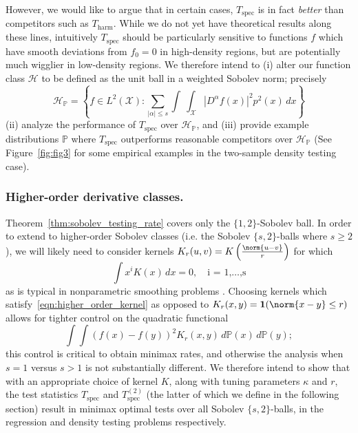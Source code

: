 \documentclass{article}
\newcommand{\abs}[1]{\left \lvert #1 \right \rvert}
\newcommand{\set}[1]{\left\{#1\right\}}
\newcommand{\1}{\mathbf{1}}
\newcommand{\Pbb}{\mathbb{P}}
\theoremstyle{alden}
\theoremstyle{aldenthm}
\theoremstyle{definition}
\theoremstyle{remark}
\begin{document}
However, we would like to argue that in certain cases, $T_{\textrm{spec}}$ is in fact \textit{better} than competitors such as $T_{\textrm{harm}}$. While we do not yet have theoretical results along these lines, intuitively $T_{\textrm{spec}}$ should be particularly sensitive to functions $f$ which have smooth deviations from $f_0 = 0$ in high-density regions, but are potentially much wigglier in low-density regions. We therefore intend to (i) alter our function class $\mathcal{H}$ to be defined as the unit ball in a weighted Sobolev norm; precisely
\begin{equation*}
\mathcal{H}_{\Pbb} = \set{f \in L^2(\mathcal{X}): \sum_{\abs{\alpha} \leq s}\int\ \int_{\mathcal{X}} \abs{D^{\alpha}f(x)}^2 p^2(x)\,dx}
\end{equation*}
(ii) analyze the performance of $T_{\mathrm{spec}}$ over $\mathcal{H}_{\Pbb}$, and (iii) provide example distributions $\Pbb$ where $T_{\mathrm{spec}}$ outperforms reasonable competitors over $\mathcal{H}_{\Pbb}$ (See Figure~\ref{fig:fig3} for some empirical examples in the two-sample density testing case).

\subsubsection{Higher-order derivative classes.}
Theorem~\ref{thm:sobolev_testing_rate} covers only the $\{1,2\}$-Sobolev ball. In order to extend to higher-order Sobolev classes (i.e. the Sobolev $\{s,2\}$-balls where $s \geq 2$), we will likely need to consider kernels $K_r(u,v) = K\left(\frac{\norm{u - v}}{r}\right)$ for which
\begin{equation}
\label{eqn:higher_order_kernel}
\int x^i K(x) \,dx = 0, \quad \textrm{i = 1,\ldots,s}
\end{equation}
as is typical in nonparametric smoothing problems \cite{tsybakov08}. Choosing kernels which satisfy~\eqref{eqn:higher_order_kernel} as opposed to $K_r(x,y) = \1(\norm{x - y} \leq r)$ allows for tighter control on the quadratic functional
\begin{equation*}
\int \int (f(x) - f(y))^2 K_r(x,y) \,d\Pbb(x) \,d\Pbb(y);
\end{equation*}
this control is critical to obtain minimax rates, and otherwise the analysis when $s = 1$ versus $s > 1$ is not substantially different. We therefore intend to show that with an appropriate choice of kernel $K$, along with tuning parameters $\kappa$ and $r$, the test statistics $T_{\mathrm{spec}}$ and $T_{\mathrm{spec}}^{(2)}$ (the latter of which we define in the following section) result in minimax optimal tests over all Sobolev $\{s,2\}$-balls, in the regression and density testing problems respectively. 
\end{document}
